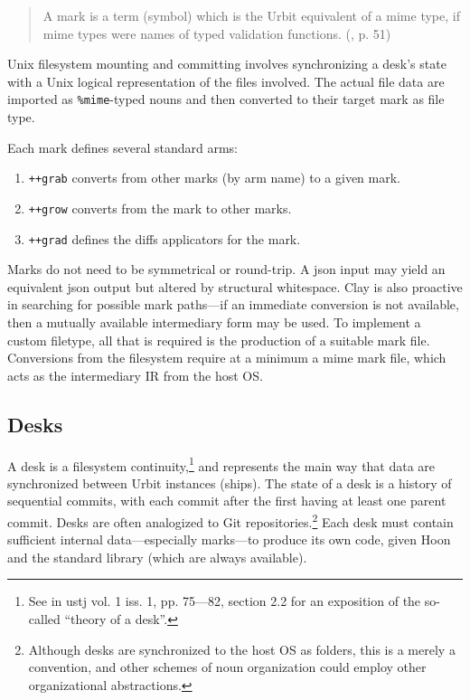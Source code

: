 \documentclass[twoside]{article}
\begin{document}
\begin{quote}
  A mark is a term (symbol) which is the Urbit equivalent of a {\sc mime} type, if {\sc mime} types were names of typed validation functions.  (\citet{Whitepaper}, p. 51)
\end{quote}

Unix filesystem mounting and committing involves synchronizing a desk's state with a Unix logical representation of the files involved.  The actual file data are imported as \lstinline[style=inlinecode]{%mime}-typed nouns and then converted to their target mark as file type.

Each mark defines several standard arms:

\begin{enumerate}
  \item  \lstinline[style=inlinecode]{++grab} converts from other marks (by arm name) to a given mark.
  \item  \lstinline[style=inlinecode]{++grow} converts from the mark to other marks.
  \item  \lstinline[style=inlinecode]{++grad} defines the diffs applicators for the mark.
\end{enumerate}

\noindent
Marks do not need to be symmetrical or round-trip.  A {\sc json} input may yield an equivalent {\sc json} output but altered by structural whitespace.  Clay is also proactive in searching for possible mark paths—if an immediate conversion is not available, then a mutually available intermediary form may be used.  To implement a custom filetype, all that is required is the production of a suitable mark file.  Conversions from the filesystem require at a minimum a {\sc mime} mark file, which acts as the intermediary IR from the host OS.

\subsection{Desks}

A desk is a filesystem continuity,\footnote{See \citet{Blackman2024a} in {\sc ustj} vol. 1 iss. 1, pp. 75—82, section 2.2 for an exposition of the so-called ``theory of a desk''.} and represents the main way that data are synchronized between Urbit instances (ships).  The state of a desk is a history of sequential commits, with each commit after the first having at least one parent commit.  Desks are often analogized to Git repositories.\footnote{Although desks are synchronized to the host OS as folders, this is a merely a convention, and other schemes of noun organization could employ other organizational abstractions.}  Each desk must contain sufficient internal data—especially marks—to produce its own code, given Hoon and the standard library (which are always available).
\end{document}
